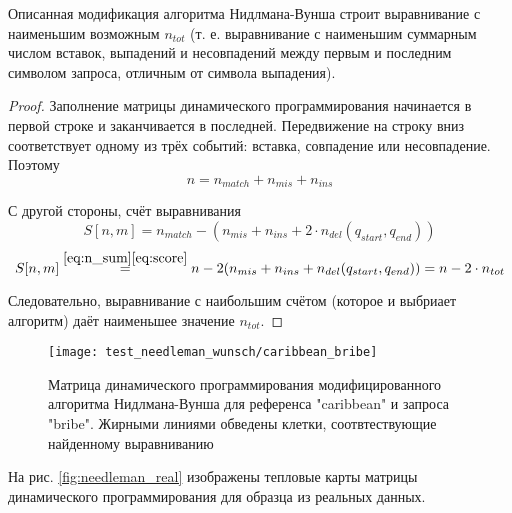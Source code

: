 \documentclass{main.tex}[subfiles]
\begin{document}
\begin{statement}
Описанная модификация алгоритма Нидлмана-Вунша строит выравнивание с наименьшим возможным $n_{tot}$ (т. е. выравнивание с наименьшим суммарным числом вставок, выпадений и несовпадений между первым и последним символом запроса, отличным от символа выпадения).
\end{statement}
\begin{proof}
Заполнение матрицы динамического программирования начинается в первой строке и заканчивается в последней.
Передвижение на строку вниз соответствует одному из трёх событий: вставка, совпадение или несовпадение.
Поэтому
\begin{equation}\label{eq:n_sum}
    n = n_{match} + n_{mis} + n_{ins}
\end{equation}

С другой стороны, счёт выравнивания
\begin{equation}\label{eq:score}
    S[n,m] = n_{match} - \left( n_{mis} + n_{ins} + 2 \cdot n_{del}(q_{start},q_{end}) \right)
\end{equation}
\begin{equation*}
    S[n,m] \overset{\eqref{eq:n_sum}\eqref{eq:score}}= n - 2(n_{mis} + n_{ins} + n_{del}(q_{start},q_{end})) = n - 2 \cdot n_{tot}
\end{equation*}

Следовательно, выравнивание с наибольшим счётом (которое и выбриает алгоритм) даёт наименьшее значение $n_{tot}$.

\end{proof}

\begin{figure}[H]
    \centering
    \texttt{[image: test\_needleman\_wunsch/caribbean\_bribe]}
    \caption{Матрица динамического программирования модифицированного алгоритма Нидлмана-Вунша для референса "caribbean"\hspace{0pt} и запроса "bribe". Жирными линиями обведены клетки, соотвтествующие найденному выравниванию }
    \label{fig:caribbean_bribe}
\end{figure}

На рис. \ref{fig:needleman_real} изображены тепловые карты матрицы динамического программирования для образца из реальных данных.
\end{document}
